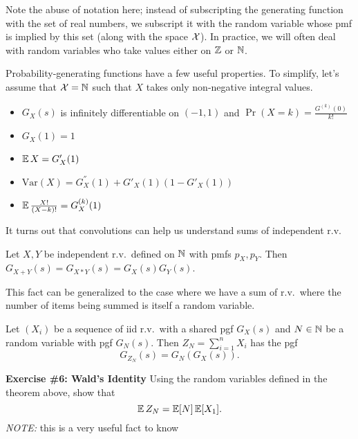 Note the abuse of notation here;
instead of subscripting the generating function with the set of real numbers,
we subscript it with the random variable whose pmf is implied by this set (along 
with the space $\mathcal X$). In practice, we will often deal with random variables who take 
values either on $\mathbb Z$ or $\mathbb N$.

Probability-generating functions have a few useful properties. To simplify, let's 
assume that $\mathcal X = \mathbb N$ such that $X$ takes only non-negative integral values.

\begin{itemize}
    \item $G_X(s)$ is infinitely differentiable on $(-1,1)$ and $\Pr(X = k) = \frac{G^{(k)}(0)}{k!}$
    \item $G_X(1) = 1$
    \item $\operatorname*{\mathbb{E}} X = G'_X(1)$
    \item $\text{Var}(X) = G_X^{''}(1) + G'_X(1)(1 - G'_X(1))$
    \item $\operatorname*{\mathbb{E}} \frac{X!}{(X-k)!} = G_X^{(k)}(1)$
\end{itemize}

It turns out that convolutions can help us understand sums of independent 
r.v.\

\begin{theorem}
    Let $X,Y$ be independent r.v.\ defined on $\mathbb N$ with pmfs $p_X, p_Y$.
    Then $G_{X+Y}(s) = G_{X*Y}(s) = G_X(s) G_Y(s)$.
\end{theorem}

This fact can be generalized to the case where we have a sum of r.v.\ where the 
number of items being summed is itself a random variable.

\begin{theorem}
    Let $(X_i)$ be a sequence of iid r.v.\ with a shared 
    pgf $G_X(s)$ and 
    $N \in \mathbb N$ be a random variable with pgf $G_N(s)$.
    Then $Z_N = \sum_{i=1}^{n} X_i$ has the pgf
    \[
        G_{Z_N}(s)
        =
        G_N \left( G_X(s) \right).
    \]
\end{theorem}

\begin{tcolorbox}
    \textbf{Exercise \#6: Wald's Identity}
    Using the random variables defined in the theorem above,
    show that 
    \[
        \operatorname*{\mathbb{E}} Z_N
        =
        \operatorname*{\mathbb{E}} [N] \operatorname*{\mathbb{E}}[X_1].
    \]
    \textit{NOTE:} this is a very useful fact to know
\end{tcolorbox}


